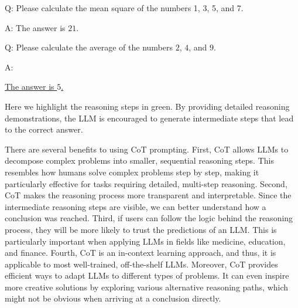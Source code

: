 \vspace{0.5em}
\begin{tcolorbox}

\begingroup
\setlength{\leftskip}{2em}
\setlength{\rightskip}{2em}

Q: Please calculate the mean square of the numbers 1, 3, 5, and 7.

\vspace{0.3em}

A:  The answer is $21$.

\vspace{0.7em}

Q: Please calculate the average of the numbers $2$, $4$, and $9$.

\vspace{0.3em}

A: \underline{}

\underline{ The answer is $5$.}

\endgroup

\end{tcolorbox}
\vspace{0.5em}

\noindent Here we highlight the reasoning steps in green. By providing detailed reasoning demonstrations, the LLM is encouraged to generate intermediate steps that lead to the correct answer.

There are several benefits to using CoT prompting. First, CoT allows LLMs to decompose complex problems into smaller, sequential reasoning steps. This resembles how humans solve complex problems step by step, making it particularly effective for tasks requiring detailed, multi-step reasoning. Second, CoT makes the reasoning process more transparent and interpretable. Since the intermediate reasoning steps are visible, we can better understand how a conclusion was reached. Third, if users can follow the logic behind the reasoning process, they will be more likely to trust the predictions of an LLM. This is particularly important when applying LLMs in fields like medicine, education, and finance. Fourth, CoT is an in-context learning approach, and thus, it is applicable to most well-trained, off-the-shelf LLMs. Moreover, CoT provides efficient ways to adapt LLMs to different types of problems. It can even inspire more creative solutions by exploring various alternative reasoning paths, which might not be obvious when arriving at a conclusion directly.

